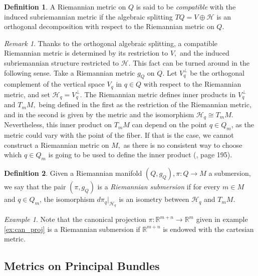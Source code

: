 \documentclass[12pt, letterpaper, reqno]{amsart}
\theoremstyle{definition}
\newtheorem{df}{Definition}
\theoremstyle{plain}
\theoremstyle{remark}
\newtheorem{ex}{Example}
\newtheorem{rem}{Remark}
\begin{document}
\begin{df}\label{df:compatible}
	A Riemannian metric on $ Q $ is said to be \textit{compatible} with the induced subriemannian metric if the algebraic splitting $ TQ = V \oplus \mathcal{H} $ is an orthogonal decomposition with respect to the Riemannian metric on $ Q$.  
\end{df}

\begin{rem}
Thanks to the orthogonal algebraic splitting, a compatible Riemannian metric is determined by its restriction to $ V, $ and the induced subriemannian structure restricted to $ \mathcal{H} $. This fact can be turned around in the following sense. Take a Riemannian metric $ g_Q $ on $ Q. $ Let $ V_q^\perp $ be the orthogonal complement of the vertical space $ V_q $ in $ q\in Q $ with respect to the Riemannian metric, and set $ \mathcal{H}_q=V_q^\perp. $ The Riemannian metric defines inner products in $ V_q^\perp $  and $ T_mM, $ being defined in the first as the restriction of the Riemannian metric, and in the second is given by the metric and the isomorphism $ \mathcal{H}_q\cong T_mM. $ Nevertheless, this inner product on $ T_mM $ can depend on the point $ q\in Q_m $, as the metric could vary with the point of the fiber. If that is the case, we cannot construct a Riemannian metric on $ M, $ as there is no consistent way to choose which $ q\in Q_m $ is going to be used to define the inner product (\cite{montgomery2002tour}, page 195).
\end{rem}

\begin{df}\label{def:riemannian_submersion}
	Given a Riemannian manifold $ (Q, g_Q), \pi: Q \rightarrow {M}
	$ a submersion, we say that the pair $ (\pi, g_Q) $ is a \textit{Riemannian submersion} if for every $ m\in M $ and $ q\in Q_m $,  the isomorphism $ d\pi_q |_{\mathcal{H}_q} $ is an isometry between $ \mathcal{H}_q $ and $ T_m M$. 
\end{df}
\begin{ex}
	Note that the canonical projection $ \pi : \mathbb{R}^{m+n} \rightarrow \mathbb{R}^m $ given in example \ref{ex:can_proj} is a Riemannian submersion if $ \mathbb{R}^{m+n} $ is endowed with the cartesian metric.
\end{ex}
\subsection{Metrics on Principal Bundles}%
\label{sub:metrics_on_principal_bundles}
\end{document}
